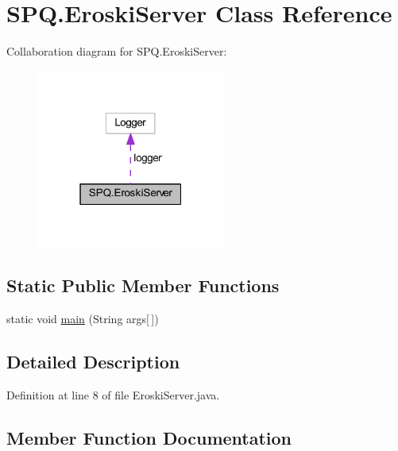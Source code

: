 \hypertarget{class_s_p_q_1_1_eroski_server}{}\section{S\+P\+Q.\+Eroski\+Server Class Reference}
\label{class_s_p_q_1_1_eroski_server}


Collaboration diagram for S\+P\+Q.\+Eroski\+Server\+:\nopagebreak
\begin{figure}[H]
\begin{center}
\leavevmode
\includegraphics[width=175pt]{class_s_p_q_1_1_eroski_server__coll__graph}
\end{center}
\end{figure}
\subsection*{Static Public Member Functions}
\begin{DoxyCompactItemize}
\item 
static void \mbox{\hyperlink{class_s_p_q_1_1_eroski_server_abd0f9fcb4551a071324e502582e46425}{main}} (String args\mbox{[}$\,$\mbox{]})
\end{DoxyCompactItemize}


\subsection{Detailed Description}


Definition at line 8 of file Eroski\+Server.\+java.



\subsection{Member Function Documentation}
\mbox{\label{class_s_p_q_1_1_eroski_server_abd0f9fcb4551a071324e502582e46425}} 
